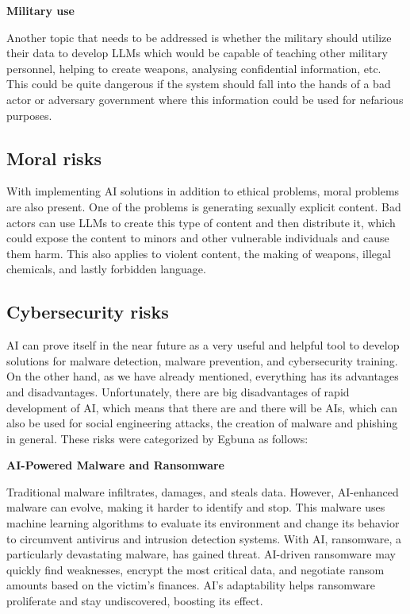 \textbf{Military use}

Another topic that needs to be addressed is whether the military should utilize their data to develop LLMs which would be capable of teaching other military personnel, helping to create weapons, analysing confidential information, etc. This could be quite dangerous if the system should fall into the hands of a bad actor or adversary government where this information could be used for nefarious purposes.


\subsection{Moral risks}
With implementing AI solutions in addition to ethical problems, moral problems are also present. One of the problems is generating sexually explicit content. Bad actors can use LLMs to create this type of content and then distribute it, which could expose the content to minors and other vulnerable individuals and cause them harm. This also applies to violent content, the making of weapons, illegal chemicals, and lastly forbidden language.


\subsection{Cybersecurity risks}
AI can prove itself in the near future as a very useful and helpful tool to develop solutions for malware detection, malware prevention, and cybersecurity training. On the other hand, as we have already mentioned, everything has its advantages and disadvantages. Unfortunately, there are big disadvantages of rapid development of AI, which means that there are and there will be AIs, which can also be used for social engineering attacks, the creation of malware and phishing in general. These risks were categorized by Egbuna\cite{Princess-Egbuna_2021} as follows:

\textbf{AI-Powered Malware and Ransomware}

Traditional malware infiltrates, damages, and steals data. However, AI-enhanced malware can evolve, making it harder to identify and stop. This malware uses machine learning algorithms to evaluate its environment and change its behavior to circumvent antivirus and intrusion detection systems.
With AI, ransomware, a particularly devastating malware, has gained threat. AI-driven ransomware may quickly find weaknesses, encrypt the most critical data, and negotiate ransom amounts based on the victim's finances. AI's adaptability helps ransomware proliferate and stay undiscovered, boosting its effect\cite{Princess-Egbuna_2021}.

